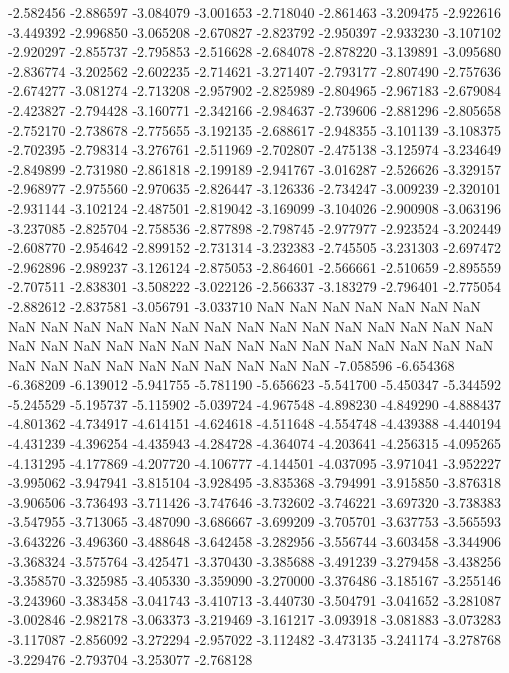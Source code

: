 -2.582456
-2.886597
-3.084079
-3.001653
-2.718040
-2.861463
-3.209475
-2.922616
-3.449392
-2.996850
-3.065208
-2.670827
-2.823792
-2.950397
-2.933230
-3.107102
-2.920297
-2.855737
-2.795853
-2.516628
-2.684078
-2.878220
-3.139891
-3.095680
-2.836774
-3.202562
-2.602235
-2.714621
-3.271407
-2.793177
-2.807490
-2.757636
-2.674277
-3.081274
-2.713208
-2.957902
-2.825989
-2.804965
-2.967183
-2.679084
-2.423827
-2.794428
-3.160771
-2.342166
-2.984637
-2.739606
-2.881296
-2.805658
-2.752170
-2.738678
-2.775655
-3.192135
-2.688617
-2.948355
-3.101139
-3.108375
-2.702395
-2.798314
-3.276761
-2.511969
-2.702807
-2.475138
-3.125974
-3.234649
-2.849899
-2.731980
-2.861818
-2.199189
-2.941767
-3.016287
-2.526626
-3.329157
-2.968977
-2.975560
-2.970635
-2.826447
-3.126336
-2.734247
-3.009239
-2.320101
-2.931144
-3.102124
-2.487501
-2.819042
-3.169099
-3.104026
-2.900908
-3.063196
-3.237085
-2.825704
-2.758536
-2.877898
-2.798745
-2.977977
-2.923524
-3.202449
-2.608770
-2.954642
-2.899152
-2.731314
-3.232383
-2.745505
-3.231303
-2.697472
-2.962896
-2.989237
-3.126124
-2.875053
-2.864601
-2.566661
-2.510659
-2.895559
-2.707511
-2.838301
-3.508222
-3.022126
-2.566337
-3.183279
-2.796401
-2.775054
-2.882612
-2.837581
-3.056791
-3.033710
NaN
NaN
NaN
NaN
NaN
NaN
NaN
NaN
NaN
NaN
NaN
NaN
NaN
NaN
NaN
NaN
NaN
NaN
NaN
NaN
NaN
NaN
NaN
NaN
NaN
NaN
NaN
NaN
NaN
NaN
NaN
NaN
NaN
NaN
NaN
NaN
NaN
NaN
NaN
NaN
NaN
NaN
NaN
NaN
NaN
NaN
NaN
-7.058596
-6.654368
-6.368209
-6.139012
-5.941755
-5.781190
-5.656623
-5.541700
-5.450347
-5.344592
-5.245529
-5.195737
-5.115902
-5.039724
-4.967548
-4.898230
-4.849290
-4.888437
-4.801362
-4.734917
-4.614151
-4.624618
-4.511648
-4.554748
-4.439388
-4.440194
-4.431239
-4.396254
-4.435943
-4.284728
-4.364074
-4.203641
-4.256315
-4.095265
-4.131295
-4.177869
-4.207720
-4.106777
-4.144501
-4.037095
-3.971041
-3.952227
-3.995062
-3.947941
-3.815104
-3.928495
-3.835368
-3.794991
-3.915850
-3.876318
-3.906506
-3.736493
-3.711426
-3.747646
-3.732602
-3.746221
-3.697320
-3.738383
-3.547955
-3.713065
-3.487090
-3.686667
-3.699209
-3.705701
-3.637753
-3.565593
-3.643226
-3.496360
-3.488648
-3.642458
-3.282956
-3.556744
-3.603458
-3.344906
-3.368324
-3.575764
-3.425471
-3.370430
-3.385688
-3.491239
-3.279458
-3.438256
-3.358570
-3.325985
-3.405330
-3.359090
-3.270000
-3.376486
-3.185167
-3.255146
-3.243960
-3.383458
-3.041743
-3.410713
-3.440730
-3.504791
-3.041652
-3.281087
-3.002846
-2.982178
-3.063373
-3.219469
-3.161217
-3.093918
-3.081883
-3.073283
-3.117087
-2.856092
-3.272294
-2.957022
-3.112482
-3.473135
-3.241174
-3.278768
-3.229476
-2.793704
-3.253077
-2.768128
